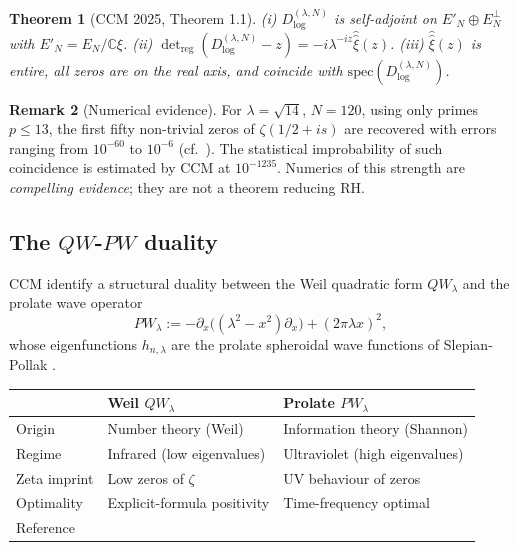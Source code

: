 \documentclass[11pt,a4paper]{article}
\theoremstyle{plain}
\newtheorem{theorem}{Theorem}[section]
\theoremstyle{definition}
\newtheorem{remark}[theorem]{Remark}
\newcommand{\C}{\mathbb{C}}
\begin{document}
\begin{theorem}[CCM 2025, Theorem 1.1]\label{thm:ccm-mainthm}
(i) $D^{(\lambda,N)}_{\log}$ is self-adjoint on $E'_N \oplus
E_N^\perp$ with $E'_N = E_N/\C\xi$.
(ii) $\det_{\mathrm{reg}}(D^{(\lambda,N)}_{\log} - z) = -i
\lambda^{-iz}\widehat{\widehat\xi}(z)$.
(iii) $\widehat{\widehat\xi}(z)$ is entire, all zeros are on the
real axis, and coincide with $\mathrm{spec}(D^{(\lambda,N)}_{\log})$.
\end{theorem}

\begin{remark}[Numerical evidence]\label{rem:ccm-numerics}
For $\lambda = \sqrt{14}$, $N = 120$, using only primes
$p \leq 13$, the first fifty non-trivial zeros of $\zeta(1/2+is)$
are recovered with errors ranging from $10^{-60}$ to $10^{-6}$
(cf.~\cite[Table~1]{ConnesConsaniMoscovici2025}).  The statistical
improbability of such coincidence is estimated by CCM at
$10^{-1235}$.  Numerics of this strength are \emph{compelling
evidence}; they are not a theorem reducing RH.
\end{remark}

\subsection{The $QW$-$PW$ duality}
\label{sec:ccm-duality}

CCM identify a structural duality between the Weil quadratic form
$QW_\lambda$ and the prolate wave operator
\[
  PW_\lambda := -\partial_x\big((\lambda^2-x^2)\partial_x\big) +
    (2\pi\lambda x)^2,
\]
whose eigenfunctions $h_{n,\lambda}$ are the prolate spheroidal
wave functions of Slepian-Pollak
\cite{SlepianPollack1961}.

\begin{center}
\small
\begin{tabular}{@{}lll@{}}
\toprule
& \textbf{Weil $QW_\lambda$} & \textbf{Prolate $PW_\lambda$} \\
\midrule
Origin        & Number theory (Weil) & Information theory (Shannon) \\
Regime        & Infrared (low eigenvalues) & Ultraviolet (high eigenvalues)\\
Zeta imprint  & Low zeros of $\zeta$ & UV behaviour of zeros\\
Optimality    & Explicit-formula positivity & Time-frequency optimal \\
Reference     & \cite{ConnesConsaniMoscovici2025} & \cite{ConnesMoscovici2022} \\
\bottomrule
\end{tabular}
\end{center}
\end{document}
